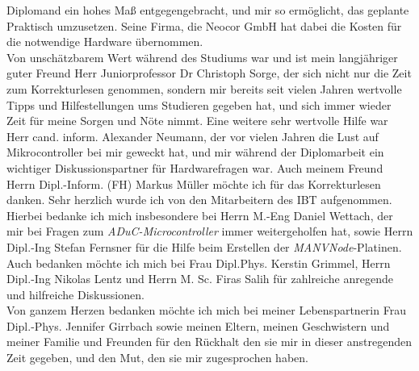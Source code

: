 Diplomand ein hohes Maß entgegengebracht, und mir so ermöglicht, das geplante Praktisch umzusetzen. Seine Firma,
die Neocor GmbH hat dabei die Kosten für die notwendige Hardware übernommen.\\
Von unschätzbarem Wert während des Studiums war und ist mein langjähriger guter Freund Herr Juniorprofessor Dr Christoph
Sorge, der sich nicht nur die Zeit zum Korrekturlesen genommen, sondern mir bereits seit vielen Jahren wertvolle
Tipps und Hilfestellungen ums Studieren gegeben hat, und sich immer wieder Zeit für meine Sorgen und Nöte nimmt. 
Eine weitere sehr wertvolle Hilfe war Herr cand. inform. Alexander Neumann, der vor vielen Jahren die Lust auf 
Mikrocontroller bei mir geweckt hat, und mir während der Diplomarbeit ein wichtiger Diskussionspartner für 
Hardwarefragen war. Auch meinem Freund Herrn Dipl.-Inform. (FH) Markus Müller möchte ich für das Korrekturlesen danken.
Sehr herzlich wurde ich von den Mitarbeitern des IBT aufgenommen. Hierbei bedanke ich mich insbesondere bei Herrn
M.-Eng Daniel Wettach, der mir bei Fragen zum \emph{ADuC-Microcontroller} immer weitergeholfen hat, sowie Herrn
Dipl.-Ing Stefan Fernsner für die Hilfe beim Erstellen der \emph{MANVNode}-Platinen. Auch bedanken möchte ich mich bei 
Frau Dipl.Phys. Kerstin Grimmel, Herrn Dipl.-Ing Nikolas 
Lentz und Herrn M. Sc. Firas Salih für zahlreiche anregende und hilfreiche Diskussionen.\\
Von ganzem Herzen bedanken möchte ich mich bei meiner Lebenspartnerin Frau Dipl.-Phys. Jennifer Girrbach sowie meinen Eltern,
meinen Geschwistern und meiner Familie und Freunden für den Rückhalt den sie mir in dieser anstregenden Zeit gegeben, und den
Mut, den sie mir zugesprochen haben.
